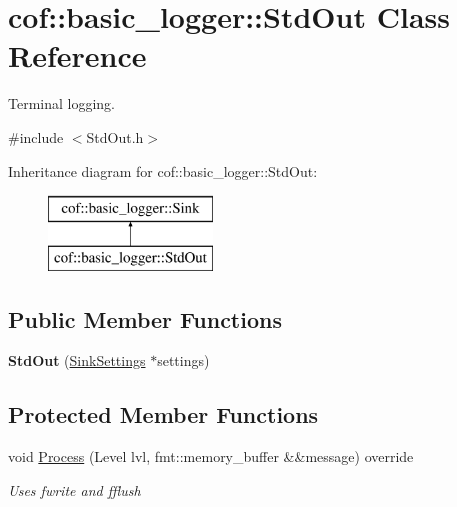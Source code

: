 \hypertarget{classcof_1_1basic__logger_1_1_std_out}{}\section{cof\+:\+:basic\+\_\+logger\+:\+:Std\+Out Class Reference}
\label{classcof_1_1basic__logger_1_1_std_out}


Terminal logging.  




{\ttfamily \#include $<$Std\+Out.\+h$>$}

Inheritance diagram for cof\+:\+:basic\+\_\+logger\+:\+:Std\+Out\+:\begin{figure}[H]
\begin{center}
\leavevmode
\includegraphics[height=2.000000cm]{classcof_1_1basic__logger_1_1_std_out}
\end{center}
\end{figure}
\subsection*{Public Member Functions}
\begin{DoxyCompactItemize}
\item 
\mbox{\label{classcof_1_1basic__logger_1_1_std_out_a2943366adfadbfeb31bb7126b4c710ae}} 
{\bfseries Std\+Out} (\hyperlink{structcof_1_1basic__logger_1_1_sink_settings}{Sink\+Settings} $\ast$settings)
\end{DoxyCompactItemize}
\subsection*{Protected Member Functions}
\begin{DoxyCompactItemize}
\item 
\mbox{\label{classcof_1_1basic__logger_1_1_std_out_a75cb54e45babb7991d57199e12f1f338}} 
void \hyperlink{classcof_1_1basic__logger_1_1_std_out_a75cb54e45babb7991d57199e12f1f338}{Process} (Level lvl, fmt\+::memory\+\_\+buffer \&\&message) override
\begin{DoxyCompactList}\small\item\em Uses {\ttfamily fwrite} and {\ttfamily fflush} \end{DoxyCompactList}\end{DoxyCompactItemize}
